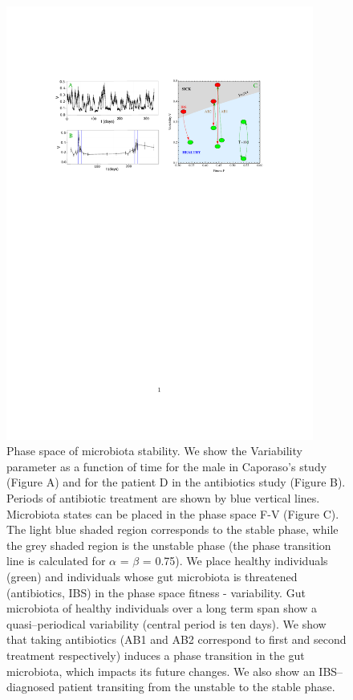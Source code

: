 \begin{figure}
\includegraphics[width=0.9\textwidth]{results/comboplot2.pdf}
\caption{Phase space of microbiota stability. We show the Variability parameter as a function of time for the male in Caporaso's study\cite{moving} (Figure A) and for the patient D in the antibiotics study\cite{antibiotic} (Figure B). Periods of antibiotic treatment are shown by blue vertical lines. Microbiota states can be placed in the phase space F-V (Figure C). The light blue shaded region corresponds to the stable phase, while the grey shaded region is the unstable phase (the phase transition line is calculated for  $\alpha$ = $\beta$ = 0.75). We place healthy individuals (green) and individuals whose gut microbiota is threatened (antibiotics, IBS) in the phase space fitness - variability. Gut microbiota of healthy individuals over a long term span show a quasi--periodical variability (central period is ten days). We show that taking antibiotics (AB1 and AB2 correspond to first and second treatment respectively) induces a phase transition in the gut microbiota, which impacts its future changes. We also show an IBS--diagnosed patient transiting from the unstable to the stable phase.}
\end{figure}


